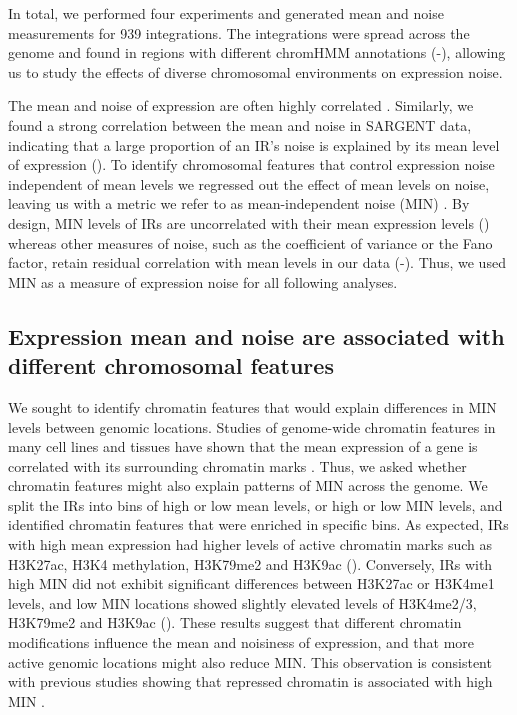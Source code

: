 In total, we performed four experiments and generated mean and noise measurements for 939 integrations. The integrations were spread across the genome and found in regions with different chromHMM annotations \cite{ernstj_kellism:DiscoveryCharacterization2010} (-), allowing us to study the effects of diverse chromosomal environments on expression noise.

The mean and noise of expression are often highly correlated \cite{vallaniaflm_mitrard:OriginConsequences2014,bar-evena_barkain:NoiseProtein2006}. Similarly, we found a strong correlation between the mean and noise in SARGENT data, indicating that a large proportion of an IR’s noise is explained by its mean level of expression (). To identify chromosomal features that control expression noise independent of mean levels we regressed out the effect of mean levels on noise, leaving us with a metric we refer to as mean-independent noise (MIN) \cite{vallaniaflm_mitrard:OriginConsequences2014}. By design, MIN levels of IRs are uncorrelated with their mean expression levels () whereas other measures of noise, such as the coefficient of variance or the Fano factor, retain residual correlation with mean levels in our data (-). Thus, we used MIN as a measure of expression noise for all following analyses.

\subsection{Expression mean and noise are associated with different chromosomal features}

We sought to identify chromatin features that would explain differences in MIN levels between genomic locations. Studies of genome-wide chromatin features in many cell lines and tissues have shown that the mean expression of a gene is correlated with its surrounding chromatin marks \cite{dunham2012n, akhtarw_vansteenselb:ChromatinPosition2013}. Thus, we asked whether chromatin features might also explain patterns of MIN across the genome. We split the IRs into bins of high or low mean levels, or high or low MIN levels, and identified chromatin features that were enriched in specific bins. As expected, IRs with high mean expression had higher levels of active chromatin marks such as H3K27ac, H3K4 methylation, H3K79me2 and H3K9ac (). Conversely, IRs with high MIN did not exhibit significant differences between H3K27ac or H3K4me1 levels, and low MIN locations showed slightly elevated levels of H3K4me2/3, H3K79me2 and H3K9ac (). These results suggest that different chromatin modifications influence the mean and noisiness of expression, and that more active genomic locations might also reduce MIN. This observation is consistent with previous studies showing that repressed chromatin is associated with high MIN \cite{faureaj_lehnerb:SystematicAnalysis2017,deyss_arkinap:OrthogonalControl2015}. 

